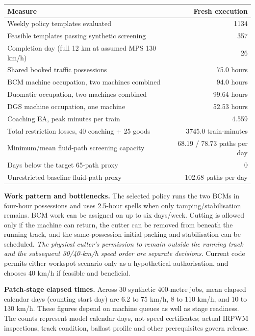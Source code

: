 \documentclass[10pt,a4paper]{article}
\begin{document}
\begin{center}\small\begin{tabular}{lr}\toprule
Measure & Fresh execution\\\midrule
Weekly policy templates evaluated & 1134\\
Feasible templates passing synthetic screening & 357\\
Completion day (full 12 km at assumed MPS 130 km/h) & 26\\
Shared booked traffic possessions & 75.0 hours\\
BCM machine occupation, two machines combined & 94.0 hours\\
Duomatic occupation, two machines combined & 99.64 hours\\
DGS machine occupation, one machine & 52.53 hours\\
Coaching EA, peak minutes per train & 4.559\\
Total restriction losses, 40 coaching + 25 goods & 3745.0 train-minutes\\
Minimum/mean fluid-path screening capacity & 68.19 / 78.73 paths per day\\
Days below the target 65-path proxy & 0\\
Unrestricted baseline fluid-path proxy & 102.68 paths per day\\
\bottomrule\end{tabular}\end{center}

\textbf{Work pattern and bottlenecks.} The selected policy runs the two BCMs in four-hour possessions and uses 2.5-hour spells when only tamping/stabilisation remains. BCM work can be assigned on up to six days/week. Cutting is allowed only if the machine can return, the cutter can be removed from beneath the running track, and the same-possession initial packing and stabilisation can be scheduled. \emph{The physical cutter's permission to remain outside the running track and the subsequent 30/40-km/h speed order are separate decisions.} Current code permits either workspot scenario only as a hypothetical authorisation, and chooses 40 km/h if feasible and beneficial.

\textbf{Patch-stage elapsed times.} Across 30 synthetic 400-metre jobs, mean elapsed calendar days (counting start day) are 6.2 to 75 km/h, 8 to 110 km/h, and 10 to 130 km/h. These figures depend on machine queues as well as stage readiness. The counts represent model calendar days, not speed certificates; actual IRPWM inspections, track condition, ballast profile and other prerequisites govern release.
\end{document}
